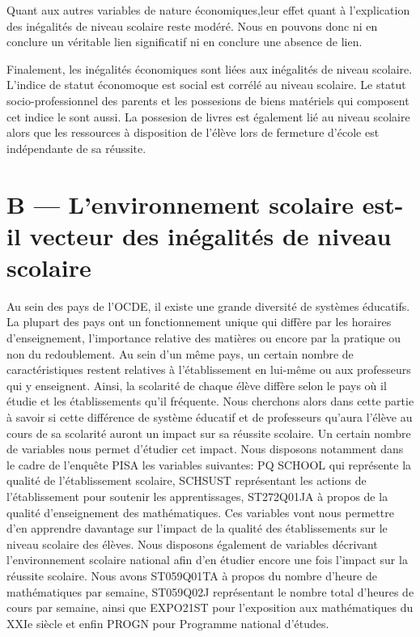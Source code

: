 \documentclass[
  french,
  11pt,
  a4paper,
]{report}
\begin{document}
Quant aux autres variables de nature économiques,leur effet quant à
l'explication des inégalités de niveau scolaire reste modéré. Nous en
pouvons donc ni en conclure un véritable lien significatif ni en
conclure une absence de lien.

Finalement, les inégalités économiques sont liées aux inégalités de
niveau scolaire. L'indice de statut économoque est social est corrélé au
niveau scolaire. Le statut socio-professionnel des parents et les
possesions de biens matériels qui composent cet indice le sont aussi. La
possesion de livres est également lié au niveau scolaire alors que les
ressources à disposition de l'élève lors de fermeture d'école est
indépendante de sa réussite.

\section{B --- L'environnement scolaire est-il vecteur des inégalités de
niveau
scolaire}\label{b-lenvironnement-scolaire-est-il-vecteur-des-inuxe9galituxe9s-de-niveau-scolaire}

Au sein des pays de l'OCDE, il existe une grande diversité de systèmes
éducatifs. La plupart des pays ont un fonctionnement unique qui diffère
par les horaires d'enseignement, l'importance relative des matières ou
encore par la pratique ou non du redoublement. Au sein d'un même pays,
un certain nombre de caractéristiques restent relatives à
l'établissement en lui-même ou aux professeurs qui y enseignent. Ainsi,
la scolarité de chaque élève diffère selon le pays où il étudie et les
établissements qu'il fréquente. Nous cherchons alors dans cette partie à
savoir si cette différence de système éducatif et de professeurs qu'aura
l'élève au cours de sa scolarité auront un impact sur sa réussite
scolaire. Un certain nombre de variables nous permet d'étudier cet
impact. Nous disposons notamment dans le cadre de l'enquête PISA les
variables suivantes: PQ SCHOOL qui représente la qualité de
l'établissement scolaire, SCHSUST représentant les actions de
l'établissement pour soutenir les apprentissages, ST272Q01JA à propos de
la qualité d'enseignement des mathématiques. Ces variables vont nous
permettre d'en apprendre davantage sur l'impact de la qualité des
établissements sur le niveau scolaire des élèves. Nous disposons
également de variables décrivant l'environnement scolaire national afin
d'en étudier encore une fois l'impact sur la réussite scolaire. Nous
avons ST059Q01TA à propos du nombre d'heure de mathématiques par
semaine, ST059Q02J représentant le nombre total d'heures de cours par
semaine, ainsi que EXPO21ST pour l'exposition aux mathématiques du XXIe
siècle et enfin PROGN pour Programme national d'études.
\end{document}
